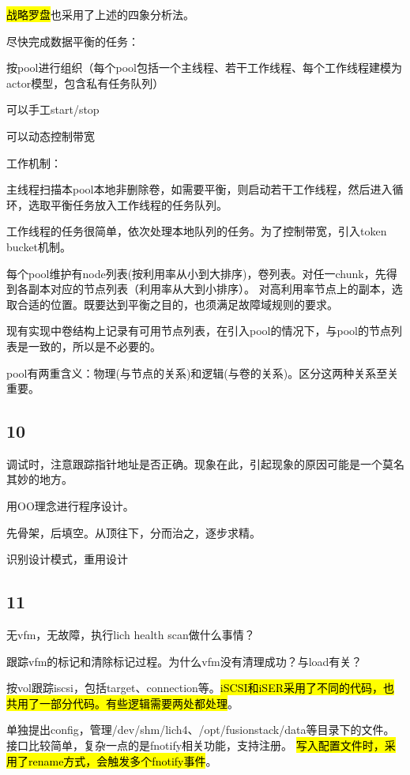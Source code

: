 \hl{战略罗盘}也采用了上述的四象分析法。

尽快完成数据平衡的任务：
\begin{enumbox}
\item 按pool进行组织（每个pool包括一个主线程、若干工作线程、每个工作线程建模为actor模型，包含私有任务队列）
\item 可以手工start/stop
\item 可以动态控制带宽
\end{enumbox}

工作机制：
\begin{enumbox}
\item 主线程扫描本pool本地非删除卷，如需要平衡，则启动若干工作线程，然后进入循环，选取平衡任务放入工作线程的任务队列。
\item 工作线程的任务很简单，依次处理本地队列的任务。为了控制带宽，引入token bucket机制。
\end{enumbox}

每个pool维护有node列表(按利用率从小到大排序)，卷列表。对任一chunk，先得到各副本对应的节点列表（利用率从大到小排序）。
对高利用率节点上的副本，选取合适的位置。既要达到平衡之目的，也须满足故障域规则的要求。

现有实现中卷结构上记录有可用节点列表，在引入pool的情况下，与pool的节点列表是一致的，所以是不必要的。

pool有两重含义：物理(与节点的关系)和逻辑(与卷的关系)。区分这两种关系至关重要。

\subsection{10}

调试时，注意跟踪指针地址是否正确。现象在此，引起现象的原因可能是一个莫名其妙的地方。

用OO理念进行程序设计。

先骨架，后填空。从顶往下，分而治之，逐步求精。

识别设计模式，重用设计

\subsection{11}

无vfm，无故障，执行lich health scan做什么事情？

跟踪vfm的标记和清除标记过程。为什么vfm没有清理成功？与load有关？

按vol跟踪iscsi，包括target、connection等。\hl{iSCSI和iSER采用了不同的代码，也共用了一部分代码。有些逻辑需要两处都处理}。

单独提出config，管理/dev/shm/lich4、/opt/fusionstack/data等目录下的文件。
接口比较简单，复杂一点的是fnotify相关功能，支持注册。
\hl{写入配置文件时，采用了rename方式，会触发多个fnotify事件}。
